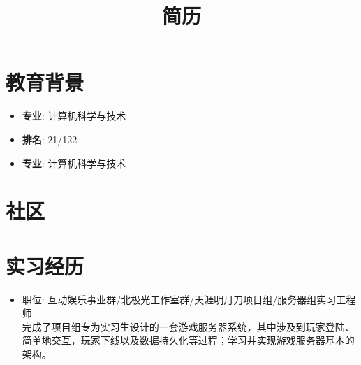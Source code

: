 \documentclass[11pt,a4paper]{moderncv}
\title{简历}               %
\begin{document}
\maketitle

\section{教育背景}
{
\begin{itemize}
\item \textbf{专业}: 计算机科学与技术
\item \textbf{排名}: 21/122
\end{itemize}
}


{
\begin{itemize}
\item \textbf{专业}: 计算机科学与技术
\end{itemize}
}


\section{社区}


\section{实习经历}
{
\begin{itemize}
\item 职位: 互动娱乐事业群/北极光工作室群/天涯明月刀项目组/服务器组实习工程师\\
完成了项目组专为实习生设计的一套游戏服务器系统，其中涉及到玩家登陆、简单地交互，玩家下线以及数据持久化等过程；学习并实现游戏服务器基本的架构。
\end{itemize}
}
\end{document}
